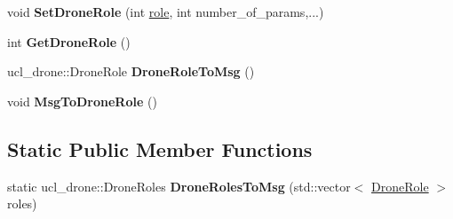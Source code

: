 \begin{DoxyCompactItemize}
\mbox{\label{classDroneRole_abd4e4edca936b2cbfdf67da92bb48762}} 
void {\bfseries Set\+Drone\+Role} (int \hyperlink{classDroneRole_a7daa71aa6eade189dfb62337b2b56b63}{role}, int number\+\_\+of\+\_\+params,...)
\item 
\mbox{\label{classDroneRole_afa3e4b99dd71de450c1c60214f30f59d}} 
int {\bfseries Get\+Drone\+Role} ()
\item 
\mbox{\label{classDroneRole_a5959cc815f11ecdb2c3652ff351bc336}} 
ucl\+\_\+drone\+::\+Drone\+Role {\bfseries Drone\+Role\+To\+Msg} ()
\item 
\mbox{\label{classDroneRole_a8ec5eeea8fa64a3ef4a5a4fe0e889426}} 
void {\bfseries Msg\+To\+Drone\+Role} ()
\end{DoxyCompactItemize}
\subsection*{Static Public Member Functions}
\begin{DoxyCompactItemize}
\item 
\mbox{\label{classDroneRole_a77f9d5ece253c26e7e8fc820890b32e8}} 
static ucl\+\_\+drone\+::\+Drone\+Roles {\bfseries Drone\+Roles\+To\+Msg} (std\+::vector$<$ \hyperlink{classDroneRole}{Drone\+Role} $>$ roles)
\end{DoxyCompactItemize}
